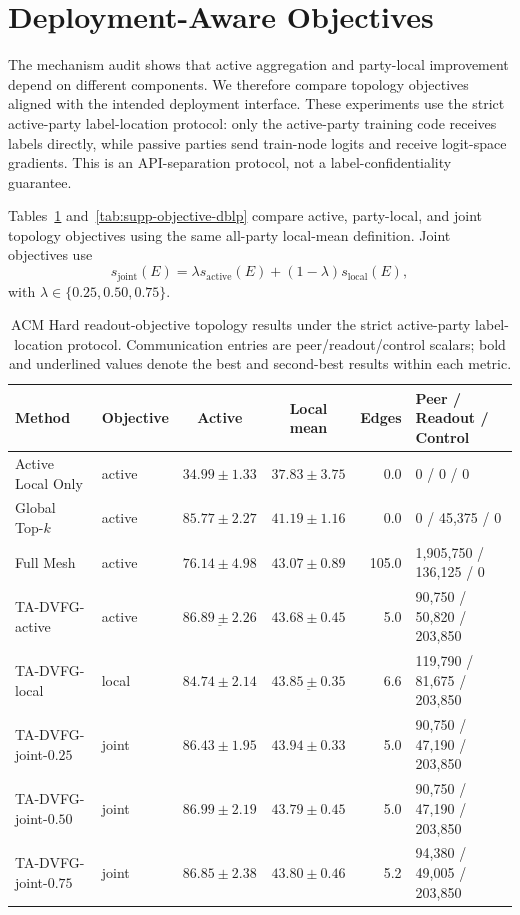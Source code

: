 \documentclass[letterpaper]{article}
\newcommand{\method}{\textsc{TA-DVFG}}
\begin{document}
\section{Deployment-Aware Objectives}

The mechanism audit shows that active aggregation and party-local improvement
depend on different components. We therefore compare topology objectives aligned
with the intended deployment interface. These experiments use the strict active-party label-location protocol: only the
active-party training code receives labels directly, while passive parties send
train-node logits and receive logit-space gradients. This is an API-separation protocol, not a
label-confidentiality guarantee.

Tables~\ref{tab:supp-objective-acm} and~\ref{tab:supp-objective-dblp}
compare active, party-local, and joint topology objectives using the same
all-party local-mean definition. Joint objectives use
\[
s_{\mathrm{joint}}(E)=\lambda s_{\mathrm{active}}(E)
+(1-\lambda)s_{\mathrm{local}}(E),
\]
with $\lambda\in\{0.25,0.50,0.75\}$.

\begin{table}[!t]
\centering
\scriptsize
\setlength{\tabcolsep}{3pt}
\caption{ACM Hard readout-objective topology results under the strict
active-party label-location protocol. Communication entries are
peer/readout/control scalars; bold and underlined values denote the best and
second-best results within each metric.}
\label{tab:supp-objective-acm}
\begin{tabular}{llccrl}
\toprule
Method & Objective & Active & Local mean & Edges & Peer / Readout / Control \\
\midrule
Active Local Only & active & $34.99\pm1.33$ & $37.83\pm3.75$ & 0.0 & 0 / 0 / 0 \\
Global Top-$k$ & active & $85.77\pm2.27$ & $41.19\pm1.16$ & 0.0 & 0 / 45,375 / 0 \\
Full Mesh & active & $76.14\pm4.98$ & $43.07\pm0.89$ & 105.0 & 1,905,750 / 136,125 / 0 \\
\method{}-active & active & $\underline{86.89\pm2.26}$ & $43.68\pm0.45$ & 5.0 & 90,750 / 50,820 / 203,850 \\
\method{}-local & local & $84.74\pm2.14$ & $\underline{43.85\pm0.35}$ & 6.6 & 119,790 / 81,675 / 203,850 \\
\method{}-joint-$0.25$ & joint & $86.43\pm1.95$ & $\mathbf{43.94\pm0.33}$ & 5.0 & 90,750 / 47,190 / 203,850 \\
\method{}-joint-$0.50$ & joint & $\mathbf{86.99\pm2.19}$ & $43.79\pm0.45$ & 5.0 & 90,750 / 47,190 / 203,850 \\
\method{}-joint-$0.75$ & joint & $86.85\pm2.38$ & $43.80\pm0.46$ & 5.2 & 94,380 / 49,005 / 203,850 \\
\bottomrule
\end{tabular}
\end{table}
\end{document}
